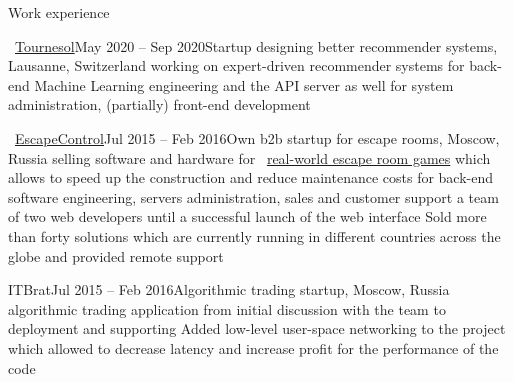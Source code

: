 \documentclass{resume} %
\newcommand{\mylink}{{\color{gray}\faExternalLink}}
\begin{document}
\begin{rSection}{Work experience}
	
	\begin{rSubsection}{\mylink~\href{http://tournesol.app}{Tournesol}}{May 2020 -- Sep 2020}{Startup designing better recommender systems, Lausanne, Switzerland}{}
		 working on expert-driven recommender systems
		 for back-end Machine Learning engineering and the API server
		 as well for system administration, (partially) front-end development
	\end{rSubsection}
	
	\begin{rSubsection}{\mylink~\href{http://escape-control.com}{EscapeControl}}{Jul 2015 -- Feb 2016}{Own b2b startup for escape rooms, Moscow, Russia}{}
		 selling software and hardware for \mylink~\href{https://www.youtube.com/watch?v=kXbubjs7aTA}{real-world escape room games} which allows to speed up the construction and reduce maintenance costs
		 for back-end software engineering, servers administration, sales and customer support
		 a team of two web developers until a successful launch of the web interface
		\myitem Sold more than forty solutions which are currently running in different countries across the globe and provided remote support
	\end{rSubsection}
	
	\begin{rSubsection}{ITBrat}{Jul 2015 -- Feb 2016}{Algorithmic trading startup, Moscow, Russia}{}
		 algorithmic trading application from initial discussion with the team to deployment and supporting
		\myitem Added low-level user-space networking to the project which allowed to decrease latency and increase profit
		 for the performance of the code
	\end{rSubsection}
	
	
\end{rSection}
\end{document}
